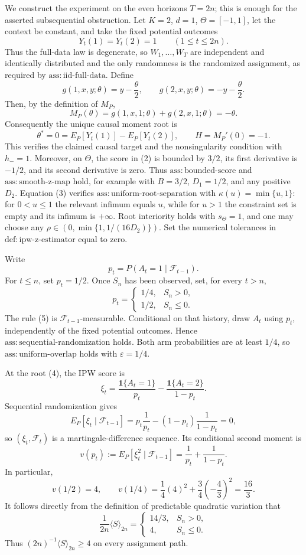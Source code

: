 We construct the experiment on the even horizons \(T=2n\); this is enough for the asserted subsequential obstruction.  Let \(K=2\), \(d=1\), \(\Theta=[-1,1]\), let the context be constant, and take the fixed potential outcomes
\[
 Y_t(1)=Y_t(2)=1\qquad(1\le t\le 2n).
\tag{1}
\]
Thus the full-data law is degenerate, so \(W_1,\ldots,W_T\) are independent and identically distributed and the only randomness is the randomized assignment, as required by \(\mathrm{ass:iid\text{-}full\text{-}data}\).  Define
\[
 g(1,x,y;\theta)=y-\frac{\theta}{2},
 \qquad
 g(2,x,y;\theta)=-y-\frac{\theta}{2}.
\tag{2}
\]
Then, by the definition of \(M_P\),
\[
 M_P(\theta)=g(1,x,1;\theta)+g(2,x,1;\theta)=-\theta.
\tag{3}
\]
Consequently the unique causal moment root is
\[
 \theta^*=0=E_P[Y_t(1)]-E_P[Y_t(2)],
 \qquad H=M_P'(0)=-1.
\tag{4}
\]
This verifies the claimed causal target and the nonsingularity condition with \(h_-=1\).  Moreover, on \(\Theta\), the score in (2) is bounded by \(3/2\), its first derivative is \(-1/2\), and its second derivative is zero.  Thus \(\mathrm{ass:bounded\text{-}score}\) and \(\mathrm{ass:smooth\text{-}z\text{-}map}\) hold, for example with \(B=3/2\), \(D_1=1/2\), and any positive \(D_2\).  Equation (3) verifies \(\mathrm{ass:uniform\text{-}root\text{-}separation}\) with \(\kappa(u)=\min\{u,1\}\): for \(0<u\le1\) the relevant infimum equals \(u\), while for \(u>1\) the constraint set is empty and its infimum is \(+\infty\).  Root interiority holds with \(s_\Theta=1\), and one may choose any \(\rho\in(0,\min\{1,1/(16D_2)\})\).  Set the numerical tolerances in \(\mathrm{def:ipw\text{-}z\text{-}estimator}\) equal to zero.

Write
\[
 p_t=P(A_t=1\mid\mathcal F_{t-1}).
\]
For \(t\le n\), set \(p_t=1/2\).  Once \(S_n\) has been observed, set, for every \(t>n\),
\[
 p_t=
 \begin{cases}
 1/4,&S_n>0,\\
 1/2,&S_n\le0.
 \end{cases}
\tag{5}
\]
The rule (5) is \(\mathcal F_{t-1}\)-measurable.  Conditional on that history, draw \(A_t\) using \(p_t\), independently of the fixed potential outcomes.  Hence \(\mathrm{ass:sequential\text{-}randomization}\) holds.  Both arm probabilities are at least \(1/4\), so \(\mathrm{ass:uniform\text{-}overlap}\) holds with \(\varepsilon=1/4\).

At the root (4), the IPW score is
\[
 \xi_t=
 \frac{\mathbf 1\{A_t=1\}}{p_t}
 -\frac{\mathbf 1\{A_t=2\}}{1-p_t}.
\tag{6}
\]
Sequential randomization gives
\[
 E_P[\xi_t\mid\mathcal F_{t-1}]
 =p_t\frac1{p_t}-(1-p_t)\frac1{1-p_t}=0,
\tag{7}
\]
so \((\xi_t,\mathcal F_t)\) is a martingale-difference sequence.  Its conditional second moment is
\[
 v(p_t):=E_P[\xi_t^2\mid\mathcal F_{t-1}]
 =\frac1{p_t}+\frac1{1-p_t}.
\tag{8}
\]
In particular,
\[
 v(1/2)=4,
 \qquad
 v(1/4)=\frac14(4)^2+\frac34\left(-\frac43\right)^2=\frac{16}{3}.
\tag{9}
\]
It follows directly from the definition of predictable quadratic variation that
\[
 \frac1{2n}\langle S\rangle_{2n}
 =
 \begin{cases}
 14/3,&S_n>0,\\
 4,&S_n\le0.
 \end{cases}
\tag{10}
\]
Thus \((2n)^{-1}\langle S\rangle_{2n}\ge4\) on every assignment path.

